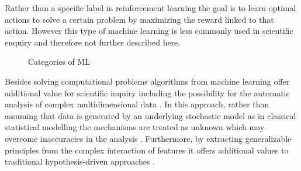 Rather than a specific label in reinforcement learning the goal is to learn optimal actions to solve a certain problem by maximizing the reward linked to that action. However this type of machine learning is less commonly used in scientific enquiry and therefore not further described here.\\
\begin{figure*}[h]
  \caption{Categories of ML}
  \label{fig1:ml_types}
\end{figure*}
Besides solving computational problems algorithms from machine learning offer additional value for scientific inquiry including the possibility for the automatic analysis of complex multidimensional data \cite{Brunton2019,Breiman2001}. In this approach, rather than assuming that data is generated by an underlying stochastic model as in classical statistical modelling the mechanisms are treated as unknown which may overcome inaccuracies in the analysis \cite{Breiman2001}. Furthermore, by extracting generalizable principles from the complex interaction of features it offers additional values to traditional hypothesis-driven approaches \cite{Vu1601,Bzdok2017}.\\

